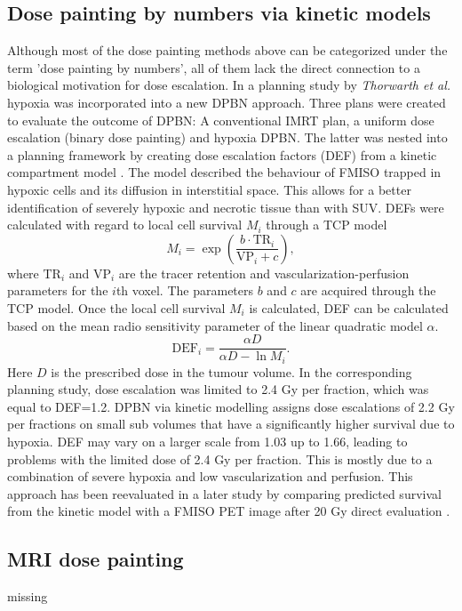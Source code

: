 \subsection{Dose painting by numbers via kinetic models}
Although most of the dose painting methods above can be categorized under the term 'dose painting by numbers', all of them lack the direct connection to a biological motivation for dose escalation. In a planning study by \textit{Thorwarth et al.} \cite{pmid17448882} hypoxia was incorporated into a new DPBN approach. Three plans were created to evaluate the outcome of DPBN: A conventional IMRT plan, a uniform dose escalation (binary dose painting) and hypoxia DPBN. The latter was nested into a planning framework by creating dose escalation factors (DEF) from a kinetic compartment model \cite{pmid15876662}. The model described the behaviour of FMISO trapped in hypoxic cells and its diffusion in interstitial space. This allows for a better identification of severely hypoxic and necrotic tissue than with SUV. DEFs were calculated with regard to local cell survival $M_i$ through a TCP model \cite{pmid16321146}
\begin{equation}
M_i = \exp\left(\frac{b\cdot \mathrm{TR}_i}{\mathrm{VP}_i+c}\right),
\end{equation}
where $\mathrm{TR}_i$ and $\mathrm{VP}_i$ are the tracer retention and vascularization-perfusion parameters for the $i$th voxel. The parameters $b$ and $c$ are acquired through the TCP model. Once the local cell survival $M_i$ is calculated, DEF can be calculated based on the mean radio sensitivity parameter of the linear quadratic model $\alpha$.
\begin{equation}
\mathrm{DEF}_i = \frac{\alpha D}{\alpha D - \ln M_i}.
\end{equation}
Here $D$ is the prescribed dose in the tumour volume. In the corresponding planning study, dose escalation was limited to 2.4 Gy per fraction, which was equal to DEF=1.2. DPBN via kinetic modelling assigns dose escalations of 2.2 Gy per fractions on small sub volumes that have a significantly higher survival due to hypoxia. DEF may vary on a larger scale from 1.03 up to 1.66, leading to problems with the limited dose of 2.4 Gy per fraction. This is mostly due to a combination of severe hypoxia and low vascularization and perfusion. This approach has been reevaluated in a later study by comparing predicted survival from the kinetic model with a FMISO PET image after 20 Gy direct evaluation \cite{pmid18524387}.
\subsection{MRI dose painting}
missing\cite{pmid14516104}
